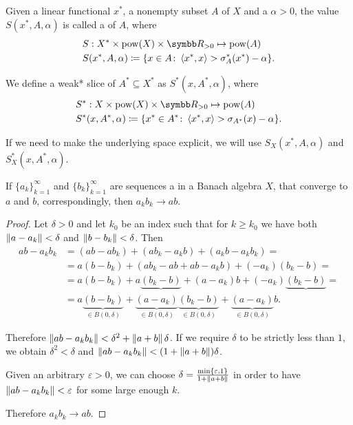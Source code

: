 \begin{definition}\label{def:banach_space_slice}\cite[definition 2.17]{Phelps1993}
  Given a linear functional \( x^* \), a nonempty subset \( A \) of \( X \) and a  \( \alpha > 0 \), the value \( S(x^*, A, \alpha) \) is called a  of \( A \), where
  \begin{align*}
    &S: X^* \times \Pow(X) \times \BR_{>0} \mapsto \Pow(A) \\
    &S(x^*, A, \alpha) \coloneqq \{ x \in A \colon \Prod {x^*} x > \sigma_A^*(x^*) - \alpha \}.
  \end{align*}

  We define a weak* slice of \( A^* \subseteq X^* \) as \( S^*(x, A^*, \alpha) \), where
  \begin{align*}
    &S^*: X \times \Pow(X) \times \BR_{>0} \mapsto \Pow(A) \\
    &S^*(x, A^*, \alpha) \coloneqq \{ x^* \in A^* \colon \Prod {x^*} x > \sigma_{A^*}(x) - \alpha \}.
  \end{align*}

  If we need to make the underlying space explicit, we will use \( S_X(x^*, A, \alpha) \) and \( S_X^*(x, A^*, \alpha) \).
\end{definition}

\begin{proposition}
  If \( \{ a_k \}_{k=1}^\infty \) and \( \{ b_k \}_{k=1}^\infty \) are sequences a in a Banach algebra \( X \), that converge to \( a \) and \( b \), correspondingly, then \( a_k b_k \to a b \).
\end{proposition}
\begin{proof}
  Let \( \delta > 0 \) and let \( k_0 \) be an index such that for \( k \geq k_0 \) we have both \( \left\Vert a - a_k \right\Vert < \delta \) and \( \left\Vert b - b_k \right\Vert < \delta \). Then
  \begin{align*}
    ab - a_k b_k
    &=
    (ab - a b_k) + (a b_k - a_k b) + (a_k b - a_k b_k)
    = \\ &=
    a (b - b_k) + (a b_k - ab + ab - a_k b) + (-a_k)(b_k - b)
    = \\ &=
    a (b - b_k) + a \underbrace{(b_k - b)} + (a - a_k) b + (-a_k)\underbrace{(b_k - b)}
    = \\ &=
    a \underbrace{(b - b_k)}_{\in B(0, \delta)} + \underbrace{(a - a_k)}_{\in B(0, \delta)} \underbrace{(b_k - b)}_{\in B(0, \delta)} + \underbrace{(a - a_k)}_{\in B(0, \delta)} b.
  \end{align*}

  Therefore \( \left\Vert ab - a_k b_k \right\Vert < \delta^2 + \left\Vert a + b \right\Vert \delta \). If we require \( \delta \) to be strictly less than \( 1 \), we obtain \( \delta^2 < \delta \) and \( \left\Vert ab - a_k b_k \right\Vert < (1 + \left\Vert a + b \right\Vert) \delta \).

  Given an arbitrary \( \varepsilon > 0 \), we can choose \( \delta = \tfrac {\min \{\varepsilon, 1 \}} {1 + \left\Vert a + b \right\Vert} \) in order to have \( \left\Vert ab - a_k b_k \right\Vert < \varepsilon \) for some large enough \( k \).

  Therefore \( a_k b_k \to a b \).
\end{proof}
